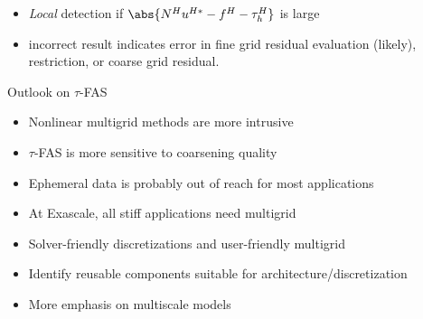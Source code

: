 \documentclass{beamer}
\newcommand{\mglevel}{\ensuremath{\ell}}
\begin{document}
\begin{frame}[fragile]
\begin{figure}
  \end{figure}
  \begin{itemize}
  \item \emph{Local} detection if $\abs{N^H u^{H*} - f^H - \tau_h^H}$ is large
  \item incorrect result indicates error in fine grid residual evaluation (likely), restriction, or coarse grid residual.
  \end{itemize}
\end{frame}

\begin{frame}{Outlook on $\tau$-FAS}
  \begin{itemize}
  \item Nonlinear multigrid methods are more intrusive
  \item $\tau$-FAS is more sensitive to coarsening quality
  \item Ephemeral data is probably out of reach for most applications
  \item At Exascale, all stiff applications need multigrid
  \item Solver-friendly discretizations and user-friendly multigrid
  \item Identify reusable components suitable for architecture/discretization
  \item More emphasis on multiscale models
  \end{itemize}
\end{frame}
\end{document}
